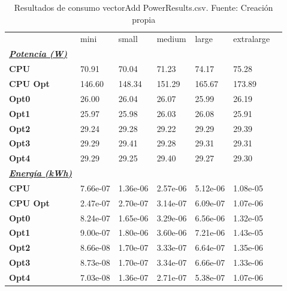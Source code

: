 \begin{table}[H]
    \centering
    \begin{tabular}{lllllll}
    \rowcolor[HTML]{DAE8FC} \ & mini & small & medium & 	large & 	extralarge \\
    \cellcolor[HTML]{DAE8FC} \textbf{\textbf{{\emph{{\underline{{Potencia (W)}}}}}}} &  &  &  & 	 & 	 \\
    \rowcolor[HTML]{EFEFEF} \cellcolor[HTML]{DAE8FC} \textbf{CPU} & 70.91 & 70.04 & 71.23 & 	74.17 & 	75.28 \\
    \cellcolor[HTML]{DAE8FC} \textbf{CPU Opt} & 146.60 & 148.34 & 151.29 & 	165.67 & 	173.89 \\
    \rowcolor[HTML]{EFEFEF} \cellcolor[HTML]{DAE8FC} \textbf{Opt0} & 26.00 & 26.04 & 26.07 & 	25.99 & 	26.19 \\
    \cellcolor[HTML]{DAE8FC} \textbf{Opt1} & 25.97 & 25.98 & 26.03 & 	26.08 & 	25.91 \\
    \rowcolor[HTML]{EFEFEF} \cellcolor[HTML]{DAE8FC} \textbf{Opt2} & 29.24 & 29.28 & 29.22 & 	29.29 & 	29.39 \\
    \cellcolor[HTML]{DAE8FC} \textbf{Opt3} & 29.29 & 29.41 & 29.28 & 	29.31 & 	29.31 \\
    \rowcolor[HTML]{EFEFEF} \cellcolor[HTML]{DAE8FC} \textbf{Opt4} & 29.29 & 29.25 & 29.40 & 	29.27 & 	29.30 \\
    \cellcolor[HTML]{DAE8FC} \textbf{\textbf{{\emph{{\underline{{Energía (kWh)}}}}}}} &  &  &  & 	 & 	 \\
    \rowcolor[HTML]{EFEFEF} \cellcolor[HTML]{DAE8FC} \textbf{CPU} & 7.66e-07 & 1.36e-06 & 2.57e-06 & 	5.12e-06 & 	1.08e-05 \\
    \cellcolor[HTML]{DAE8FC} \textbf{CPU Opt} & 2.47e-07 & 2.70e-07 & 3.14e-07 & 	6.09e-07 & 	1.07e-06 \\
    \rowcolor[HTML]{EFEFEF} \cellcolor[HTML]{DAE8FC} \textbf{Opt0} & 8.24e-07 & 1.65e-06 & 3.29e-06 & 	6.56e-06 & 	1.32e-05 \\
    \cellcolor[HTML]{DAE8FC} \textbf{Opt1} & 9.00e-07 & 1.80e-06 & 3.60e-06 & 	7.21e-06 & 	1.43e-05 \\
    \rowcolor[HTML]{EFEFEF} \cellcolor[HTML]{DAE8FC} \textbf{Opt2} & 8.66e-08 & 1.70e-07 & 3.33e-07 & 	6.64e-07 & 	1.35e-06 \\
    \cellcolor[HTML]{DAE8FC} \textbf{Opt3} & 8.73e-08 & 1.70e-07 & 3.34e-07 & 	6.66e-07 & 	1.33e-06 \\
    \rowcolor[HTML]{EFEFEF} \cellcolor[HTML]{DAE8FC} \textbf{Opt4} & 7.03e-08 & 1.36e-07 & 2.71e-07 & 	5.38e-07 & 	1.07e-06 \\
    \end{tabular}
    \caption[Resultados de consumo vectorAdd PowerResults.csv]{{Resultados de consumo vectorAdd PowerResults.csv. Fuente: Creación propia}}
    \label{table_global_vectorAdd_PowerResults_data}
\end{table}